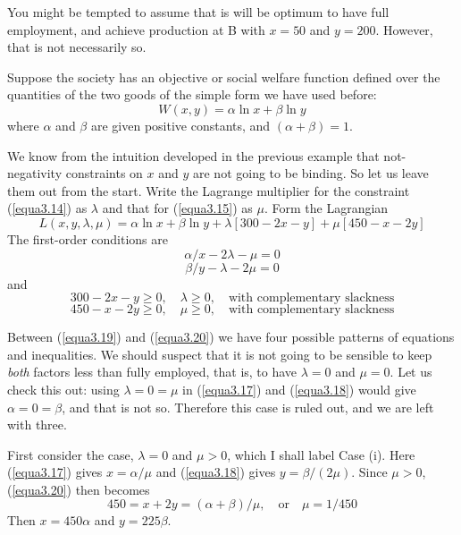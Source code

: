 You might be tempted to assume that is will be optimum to have full employment, and achieve production at B with $x=50$ and $y=200$. However, that is not necessarily so.

Suppose the society has an objective or social welfare function defined over the quantities of the two goods of the simple form we have used before:
\begin{equation} \label{equa3.16}
W(x,y ) = \alpha \ln x + \beta \ln y
\end{equation}
where $\alpha$ and $\beta$ are given positive constants, and $(\alpha + \beta)=1$.

We know from the intuition developed in the previous example that not-negativity constraints on $x$ and $y$ are not going to be binding. So let us leave them out from the start. Write the Lagrange multiplier for the constraint (\ref{equa3.14}) as $\lambda$ and that for (\ref{equa3.15}) as $\mu$. Form the Lagrangian
\begin{equation*}
L(x,y,\lambda, \mu) = \alpha \ln x + \beta \ln y + \lambda [300-2x-y] + \mu[450-x-2y]
\end{equation*}
The first-order conditions are
\begin{equation} \label{equa3.17}
\alpha /x -2 \lambda - \mu =0
\end{equation}
\begin{equation} \label{equa3.18}
\beta /y - \lambda - 2\mu =0
\end{equation}
and
\begin{equation} \label{equa3.19}
300 -2x - y \geq 0, \quad \lambda \geq 0, \quad \mbox{with complementary slackness}
\end{equation}
\begin{equation} \label{equa3.20}
450 -x - 2y \geq 0, \quad \mu \geq 0, \quad \mbox{with complementary slackness}
\end{equation}

Between (\ref{equa3.19}) and (\ref{equa3.20}) we have four possible patterns of equations and inequalities. We should suspect that it is not going to be sensible to keep \textit{both} factors less than fully employed, that is, to have $\lambda=0$ and $\mu=0$. Let us check this out: using $\lambda=0=\mu$ in (\ref{equa3.17}) and (\ref{equa3.18}) would give $\alpha=0=\beta$, and that is not so. Therefore this case is ruled out, and we are left with three.

First consider the case, $\lambda=0$ and $\mu >0$, which I shall label Case (i). Here (\ref{equa3.17}) gives $x=\alpha /\mu$ and (\ref{equa3.18}) gives $y=\beta/ (2\mu)$. Since $\mu >0$, (\ref{equa3.20}) then becomes
\begin{equation*}
450 = x+ 2y = (\alpha + \beta)/\mu, \quad \mbox{or} \quad \mu = 1/450
\end{equation*}
Then $x=450 \alpha$ and $y=225 \beta$.

